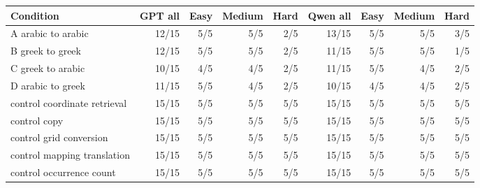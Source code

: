 \begin{tabular}{p{4.4cm}rrrrrrrr}
\toprule
Condition & GPT all & Easy & Medium & Hard & Qwen all & Easy & Medium & Hard\\
\midrule
A arabic to arabic & 12/15 & 5/5 & 5/5 & 2/5 & 13/15 & 5/5 & 5/5 & 3/5\\
B greek to greek & 12/15 & 5/5 & 5/5 & 2/5 & 11/15 & 5/5 & 5/5 & 1/5\\
C greek to arabic & 10/15 & 4/5 & 4/5 & 2/5 & 11/15 & 5/5 & 4/5 & 2/5\\
D arabic to greek & 11/15 & 5/5 & 4/5 & 2/5 & 10/15 & 4/5 & 4/5 & 2/5\\
control coordinate retrieval & 15/15 & 5/5 & 5/5 & 5/5 & 15/15 & 5/5 & 5/5 & 5/5\\
control copy & 15/15 & 5/5 & 5/5 & 5/5 & 15/15 & 5/5 & 5/5 & 5/5\\
control grid conversion & 15/15 & 5/5 & 5/5 & 5/5 & 15/15 & 5/5 & 5/5 & 5/5\\
control mapping translation & 15/15 & 5/5 & 5/5 & 5/5 & 15/15 & 5/5 & 5/5 & 5/5\\
control occurrence count & 15/15 & 5/5 & 5/5 & 5/5 & 15/15 & 5/5 & 5/5 & 5/5\\
\bottomrule
\end{tabular}
